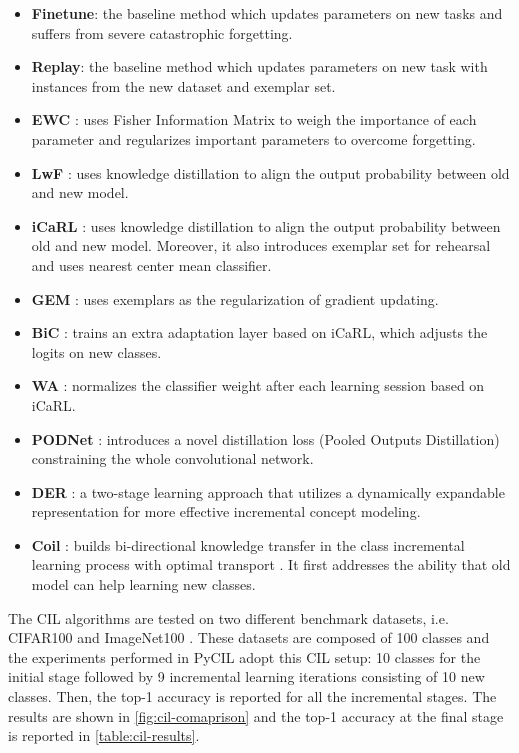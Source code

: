 \begin{itemize}
    \item \textbf{Finetune}: the baseline method which updates parameters on new tasks and
    suffers from severe catastrophic forgetting.
    \item \textbf{Replay}: the baseline method which updates parameters on new task with instances
    from the new dataset and exemplar set.
    \item \textbf{EWC} \cite{kirkpatrick2017overcoming}: uses Fisher Information Matrix to weigh the
    importance of each parameter and regularizes important parameters to overcome forgetting.
    \item \textbf{LwF} \cite{li2017learning}: uses knowledge distillation \cite{hinton2015distilling} to
    align the output probability between old and new model.
    \item \textbf{iCaRL} \cite{rebuffi2017icarl}: uses knowledge distillation  \cite{hinton2015distilling}  to
    align the output probability between old and new model. Moreover, it also introduces
    exemplar set for rehearsal and uses nearest center mean classifier.
    \item \textbf{GEM} \cite{lopez2017gradient}: uses exemplars as the regularization of
    gradient updating.
    \item \textbf{BiC} \cite{wu2019large}: trains an extra adaptation layer based on iCaRL, which
    adjusts the logits on new classes.
    \item \textbf{WA} \cite{zhao2020maintaining}: normalizes the classifier weight after each learning session
    based on iCaRL.
    \item \textbf{PODNet} \cite{douillard2020podnet}: introduces a novel distillation loss (Pooled
    Outputs Distillation) constraining the whole convolutional network.
    \item \textbf{DER} \cite{yan2021dynamically}: a two-stage learning approach that utilizes a dynamically
    expandable representation for more effective incremental concept modeling.
    \item \textbf{Coil} \cite{zhou2021co}: builds bi-directional knowledge transfer in the class incremental learning process with optimal transport \cite{villani2009optimal}. It first addresses
    the ability that old model can help learning new classes.
\end{itemize}

The CIL algorithms are tested on two different benchmark datasets, i.e. CIFAR100 \cite{krizhevsky2009learning} and ImageNet100 \cite{russakovsky2015imagenet}. These datasets are composed of 100 classes and the experiments performed in PyCIL \cite{zhou2021pycil} adopt this CIL setup: 10 classes for the initial stage followed by 9 incremental learning iterations consisting of 10 new classes. Then, the top-1 accuracy is reported for all the incremental stages.
The results are shown in \autoref{fig:cil-comaprison} and the top-1 accuracy at the final stage is reported in \autoref{table:cil-results}.


